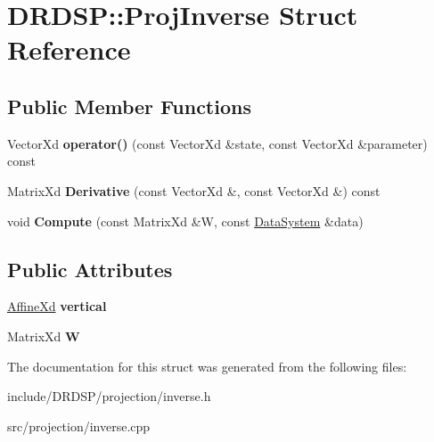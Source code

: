 \hypertarget{struct_d_r_d_s_p_1_1_proj_inverse}{\section{D\-R\-D\-S\-P\-:\-:Proj\-Inverse Struct Reference}
\label{struct_d_r_d_s_p_1_1_proj_inverse}
}
\subsection*{Public Member Functions}
\begin{DoxyCompactItemize}
\item 
\hypertarget{struct_d_r_d_s_p_1_1_proj_inverse_a8b783fa7bb9382303b79f8c0c1b6211f}{Vector\-Xd {\bfseries operator()} (const Vector\-Xd \&state, const Vector\-Xd \&parameter) const }\label{struct_d_r_d_s_p_1_1_proj_inverse_a8b783fa7bb9382303b79f8c0c1b6211f}

\item 
\hypertarget{struct_d_r_d_s_p_1_1_proj_inverse_a7df4615a227f887f40064ae85054d4dc}{Matrix\-Xd {\bfseries Derivative} (const Vector\-Xd \&, const Vector\-Xd \&) const }\label{struct_d_r_d_s_p_1_1_proj_inverse_a7df4615a227f887f40064ae85054d4dc}

\item 
\hypertarget{struct_d_r_d_s_p_1_1_proj_inverse_a60edc568c1f7a2b76844a6d878064e7e}{void {\bfseries Compute} (const Matrix\-Xd \&W, const \hyperlink{struct_d_r_d_s_p_1_1_data_system}{Data\-System} \&data)}\label{struct_d_r_d_s_p_1_1_proj_inverse_a60edc568c1f7a2b76844a6d878064e7e}

\end{DoxyCompactItemize}
\subsection*{Public Attributes}
\begin{DoxyCompactItemize}
\item 
\hypertarget{struct_d_r_d_s_p_1_1_proj_inverse_a6d655e101dcf876e8a140339afa925bb}{\hyperlink{struct_d_r_d_s_p_1_1_affine}{Affine\-Xd} {\bfseries vertical}}\label{struct_d_r_d_s_p_1_1_proj_inverse_a6d655e101dcf876e8a140339afa925bb}

\item 
\hypertarget{struct_d_r_d_s_p_1_1_proj_inverse_a5870ff2bd6af72f05fc69e11082d34e5}{Matrix\-Xd {\bfseries W}}\label{struct_d_r_d_s_p_1_1_proj_inverse_a5870ff2bd6af72f05fc69e11082d34e5}

\end{DoxyCompactItemize}


The documentation for this struct was generated from the following files\-:\begin{DoxyCompactItemize}
\item 
include/\-D\-R\-D\-S\-P/projection/inverse.\-h\item 
src/projection/inverse.\-cpp\end{DoxyCompactItemize}
